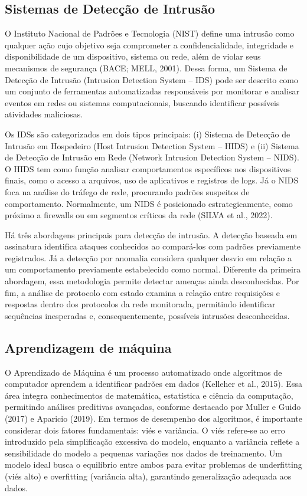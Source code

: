 \documentclass[conference]{IEEEtran}
\begin{document}
\subsection{Sistemas de Detecção de Intrusão}

    O Instituto Nacional de Padrões e Tecnologia (NIST) define uma intrusão como qualquer ação cujo objetivo seja comprometer a confidencialidade, integridade e disponibilidade de um dispositivo, sistema ou rede, além de violar seus mecanismos de segurança (BACE; MELL, 2001). Dessa forma, um Sistema de Detecção de Intrusão (Intrusion Detection System – IDS) pode ser descrito como um conjunto de ferramentas automatizadas responsáveis por monitorar e analisar eventos em redes ou sistemas computacionais, buscando identificar possíveis atividades maliciosas.
    
    Os IDSs são categorizados em dois tipos principais: (i) Sistema de Detecção de Intrusão em Hospedeiro (Host Intrusion Detection System – HIDS) e (ii) Sistema de Detecção de Intrusão em Rede (Network Intrusion Detection System – NIDS). O HIDS tem como função analisar comportamentos específicos nos dispositivos finais, como o acesso a arquivos, uso de aplicativos e registros de logs. Já o NIDS foca na análise do tráfego de rede, procurando padrões suspeitos de comportamento. Normalmente, um NIDS é posicionado estrategicamente, como próximo a firewalls ou em segmentos críticos da rede (SILVA et al., 2022).
    
    Há três abordagens principais para detecção de intrusão. A detecção baseada em assinatura identifica ataques conhecidos ao compará-los com padrões previamente registrados. Já a detecção por anomalia considera qualquer desvio em relação a um comportamento previamente estabelecido como normal. Diferente da primeira abordagem, essa metodologia permite detectar ameaças ainda desconhecidas. Por fim, a análise de protocolo com estado examina a relação entre requisições e respostas dentro dos protocolos da rede monitorada, permitindo identificar sequências inesperadas e, consequentemente, possíveis intrusões desconhecidas.


\subsection{Aprendizagem de máquina}

    O Aprendizado de Máquina é um processo automatizado onde algoritmos de computador aprendem a identificar padrões em dados (Kelleher et al., 2015). Essa área integra conhecimentos de matemática, estatística e ciência da computação, permitindo análises preditivas avançadas, conforme destacado por Muller e Guido (2017) e Aparicio (2019). Em termos de desempenho dos algoritmos, é importante considerar dois fatores fundamentais: viés e variância. O viés refere-se ao erro introduzido pela simplificação excessiva do modelo, enquanto a variância reflete a sensibilidade do modelo a pequenas variações nos dados de treinamento. Um modelo ideal busca o equilíbrio entre ambos para evitar problemas de underfitting (viés alto) e overfitting (variância alta), garantindo generalização adequada aos dados.
\end{document}
